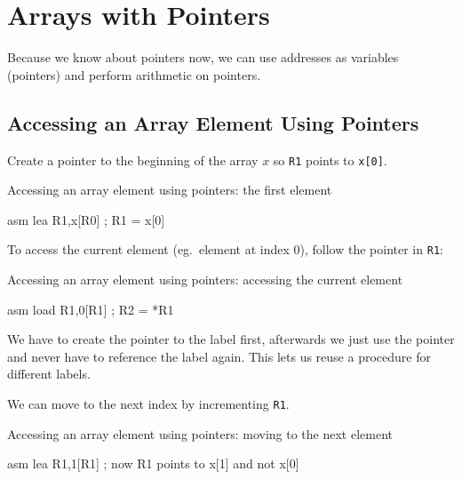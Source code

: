 \section{Arrays with Pointers}\label{sec:arrays_with_pointers}

Because we know about pointers now, we can use addresses as variables (pointers) and perform arithmetic on pointers.

\subsection{Accessing an Array Element Using Pointers}\label{sub:accessing_an_array_element_using_pointers}

Create a pointer to the beginning of the array \(x\) so \texttt{R1} points to \texttt{x[0]}.

\begin{highlight}{Accessing an array element using pointers: the first element}
    \begin{code}{asm}
		lea R1,x[R0] ; R1 = x[0]
    \end{code}
\end{highlight}

\noindent
To access the current element (eg.\ element at index \(0\)), follow the pointer in \texttt{R1}:

\begin{highlight}{Accessing an array element using pointers: accessing the current element}
    \begin{code}{asm}
		load R1,0[R1] ; R2 = *R1
    \end{code}
\end{highlight}

\begin{note}
	We have to create the pointer to the label first, afterwards we just use the pointer and never have to reference the label again.
	This lets us reuse a procedure for different labels.
\end{note}

\noindent
We can move to the next index by incrementing \texttt{R1}.

\begin{highlight}{Accessing an array element using pointers: moving to the next element}
    \begin{code}{asm}
		lea R1,1[R1] ; now R1 points to x[1] and not x[0]
    \end{code}
\end{highlight}

